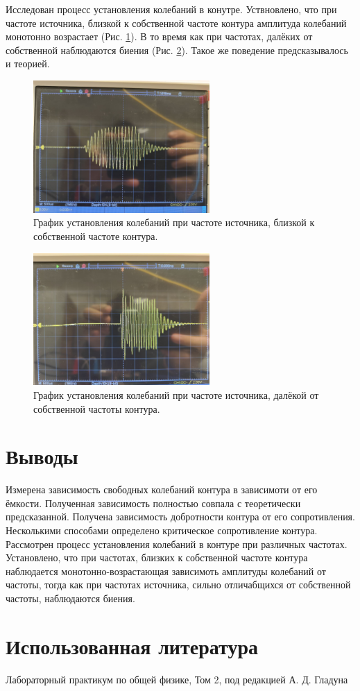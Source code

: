 \documentclass[12pt]{article}
\begin{document}
Исследован процесс установления колебаний в конутре. Уствновлено, что при частоте источника, близкой к собственной 
частоте контура амплитуда колебаний монотонно возрастает (Рис. \ref{pic:1}). В то время как при частотах, 
далёких от собственной наблюдаются биения (Рис. \ref{pic:2}). Такое же поведение предсказывалось и теорией.
\begin{figure}[H]
	\centering
	\includegraphics[width=0.6\textwidth]{3.jpg}
	\caption{График установления колебаний при частоте источника, близкой к собственной частоте контура.}
	\label{pic:1}
\end{figure}
\begin{figure}[H]
	\centering
	\includegraphics[width=0.6\textwidth]{2.jpg}
	\caption{График установления колебаний при частоте источника, далёкой от собственной частоты контура.}
	\label{pic:2}
\end{figure}

\section*{Выводы}
Измерена зависимость свободных колебаний контура в зависимоти от его ёмкости. Полученная зависимость полностью 
совпала с теоретически предсказанной. Получена зависимость добротности контура от его сопротивления. Несколькими 
способами определено критическое сопротивление контура. Рассмотрен процесс установления колебаний в контуре при 
различных частотах. Установлено, что при частотах, близких к собственной частоте контура наблюдается монотонно-возрастающая 
зависимоть амплитуды колебаний от частоты, тогда как при частотах источника, сильно отличабщихся от собственной частоты, наблюдаются биения.

\section*{Использованная литература}
\begin{thebibliography}{9}
	Лабораторный практикум по общей физике, Том 2, под редакцией А. Д. Гладуна
\end{thebibliography}
\end{document}
